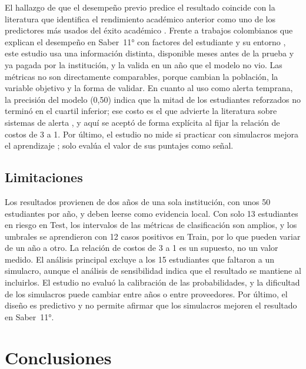 \documentclass[10pt,letterpaper,twocolumn]{article}
\newcommand{\parencite}{\citep}
\begin{document}
El hallazgo de que el desempeño previo predice el resultado coincide con la literatura que identifica el rendimiento académico anterior como uno de los predictores más usados del éxito académico \parencite{alyahyan2020predicting}. Frente a trabajos colombianos que explican el desempeño en Saber~11° con factores del estudiante y su entorno \parencite{timaran2019arboles}, este estudio usa una información distinta, disponible meses antes de la prueba y ya pagada por la institución, y la valida en un año que el modelo no vio. Las métricas no son directamente comparables, porque cambian la población, la variable objetivo y la forma de validar. En cuanto al uso como alerta temprana, la precisión del modelo (0,50) indica que la mitad de los estudiantes reforzados no terminó en el cuartil inferior; ese costo es el que advierte la literatura sobre sistemas de alerta \parencite{bowers2013dropout}, y aquí se aceptó de forma explícita al fijar la relación de costos de 3 a 1. Por último, el estudio no mide si practicar con simulacros mejora el aprendizaje \parencite{roediger2006test}; solo evalúa el valor de sus puntajes como señal.

\subsection{Limitaciones}

Los resultados provienen de dos años de una sola institución, con unos 50 estudiantes por año, y deben leerse como evidencia local. Con solo 13 estudiantes en riesgo en Test, los intervalos de las métricas de clasificación son amplios, y los umbrales se aprendieron con 12 casos positivos en Train, por lo que pueden variar de un año a otro. La relación de costos de 3 a 1 es un supuesto, no un valor medido. El análisis principal excluye a los 15 estudiantes que faltaron a un simulacro, aunque el análisis de sensibilidad indica que el resultado se mantiene al incluirlos. El estudio no evaluó la calibración de las probabilidades, y la dificultad de los simulacros puede cambiar entre años o entre proveedores. Por último, el diseño es predictivo y no permite afirmar que los simulacros mejoren el resultado en Saber~11°.

\section{Conclusiones}
\end{document}
